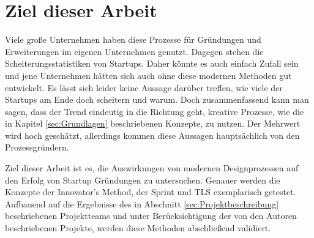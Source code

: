\section{Ziel dieser Arbeit}
Viele große Unternehmen haben diese Prozesse für Gründungen und Erweiterungen im eigenen Unternehmen genutzt. Dagegen stehen die Scheiterungsstatistiken von Startups. Daher könnte es auch einfach Zufall sein und jene Unternehmen hätten sich auch ohne diese modernen Methoden gut entwickelt. Es lässt sich leider keine Aussage darüber treffen, wie viele der Startups am Ende doch scheitern und warum. Doch zusammenfassend kann man sagen, dass der Trend eindeutig in die Richtung geht, kreative Prozesse, wie die in Kapitel \ref{sec:Grundlagen} beschriebenen Konzepte, zu nutzen. Der Mehrwert wird hoch geschätzt, allerdings kommen diese Aussagen hauptsächlich von den Prozessgründern.

Ziel dieser Arbeit ist es, die Auswirkungen von modernen Designprozessen auf den Erfolg von Startup Gründungen zu untersuchen. Genauer werden die Konzepte der Innovator's Method, der Sprint und \ac{TLS} exemplarisch getestet. Aufbauend auf die Ergebnisse des in Abschnitt \ref{sec:Projektbeschreibung} beschriebenen Projektteams und unter Berücksichtigung der von den Autoren beschriebenen Projekte, werden diese Methoden abschließend validiert. 